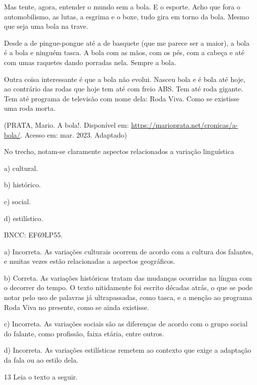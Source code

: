 Mas tente, agora, entender o mundo sem a bola. E o esporte. Acho que
fora o automobilismo, as lutas, a esgrima e o boxe, tudo gira em torno
da bola. Mesmo que seja uma bola na trave.

Desde a de pingue-pongue até a de basquete (que me parece ser a maior),
a bola é a bola e ninguém tasca. A bola com as mãos, com os pés, com a
cabeça e até com umas raquetes dando porradas nela. Sempre a bola.

Outra coisa interessante é que a bola não evolui. Nasceu bola e é bola
até hoje, ao contrário das rodas que hoje tem até com freio ABS. Tem até
roda gigante. Tem até programa de televisão com nome dela: Roda Viva.
Como se existisse uma roda morta.

(PRATA, Mario. A bola!. Disponível em: 
\url{https://marioprata.net/cronicas/a-bola/}. Acesso em:
mar. 2023. Adaptado)

No trecho, notam-se claramente aspectos relacionados a variação
linguística

a) cultural.

b) histórico.

c) social.

d) estilístico.

BNCC: EF69LP55.

a) Incorreta. As variações culturais ocorrem de acordo com a cultura dos
falantes, e muitas vezes estão relacionadas a aspectos geográficos.

b) Correta. As variações históricas tratam das mudanças ocorridas na
língua com o decorrer do tempo. O texto nitidamente foi escrito décadas
atrás, o que se pode notar pelo uso de palavras já ultrapassadas, como
tasca, e a menção ao programa Roda Viva no presente, como se ainda
existisse.

c) Incorreta. As variações sociais são as diferenças de acordo com o
grupo social do falante, como profissão, faixa etária, entre outros.

d) Incorreta. As variações estilísticas remetem ao contexto que exige a
adaptação da fala ou ao estilo dela.

\num{13} Leia o texto a seguir.

